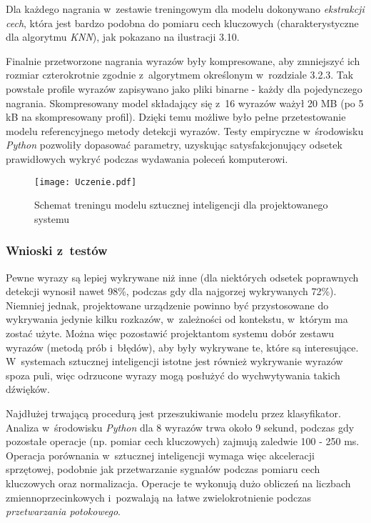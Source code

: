 Dla każdego nagrania w~zestawie treningowym dla modelu dokonywano \textit{ekstrakcji cech}, która jest bardzo podobna do pomiaru cech kluczowych (charakterystyczne dla algorytmu \textit{KNN}), jak pokazano na ilustracji 3.10.

Finalnie przetworzone nagrania wyrazów były kompresowane, aby zmniejszyć ich rozmiar czterokrotnie zgodnie z~algorytmem określonym w~rozdziale 3.2.3. Tak powstałe profile wyrazów zapisywano jako pliki binarne - każdy dla pojedynczego nagrania. Skompresowany model składający się z~16 wyrazów ważył 20 MB (po 5 kB na skompresowany profil). Dzięki temu możliwe było pełne przetestowanie modelu referencyjnego metody detekcji wyrazów. Testy empiryczne w~środowisku \textit{Python} pozwoliły dopasować parametry, uzyskując satysfakcjonujący odsetek prawidłowych wykryć podczas wydawania poleceń komputerowi.

\begin{figure}[h]
	\centering
	\texttt{[image: Uczenie.pdf]}
	\caption{Schemat treningu modelu sztucznej inteligencji dla projektowanego systemu}
\end{figure}
\FloatBarrier %

\subsubsection{Wnioski z~testów}

Pewne wyrazy są lepiej wykrywane niż inne (dla niektórych odsetek poprawnych detekcji wynosił nawet 98\%, podczas gdy dla najgorzej wykrywanych 72\%). Niemniej jednak, projektowane urządzenie powinno być przystosowane do wykrywania jedynie kilku rozkazów, w~zależności od kontekstu, w~którym ma zostać użyte. Można więc pozostawić projektantom systemu dobór zestawu wyrazów (metodą prób i~błędów), aby były wykrywane te, które są interesujące. W~systemach sztucznej inteligencji istotne jest również wykrywanie wyrazów spoza puli, więc odrzucone wyrazy mogą posłużyć do wychwytywania takich dźwięków.

Najdłużej trwającą procedurą jest przeszukiwanie modelu przez klasyfikator. Analiza w~środowisku \textit{Python} dla 8 wyrazów trwa około 9 sekund, podczas gdy pozostałe operacje (np. pomiar cech kluczowych) zajmują zaledwie 100 - 250 ms. Operacja porównania w~sztucznej inteligencji wymaga więc akceleracji sprzętowej, podobnie jak przetwarzanie sygnałów podczas pomiaru cech kluczowych oraz normalizacja. Operacje te wykonują dużo obliczeń na liczbach zmiennoprzecinkowych i~pozwalają na łatwe zwielokrotnienie podczas \textit{przetwarzania potokowego}.

